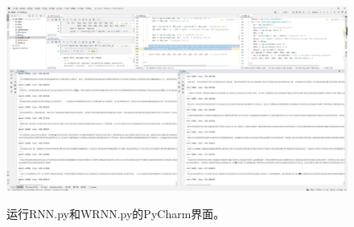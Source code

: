 \documentclass[letterpaper,12pt]{article}
\begin{document}
	\begin{figure}[htbp] 
		\centering 
		\includegraphics[width=\linewidth]{train}
		\captionsetup{font=scriptsize}
		\label{train}
		\captionsetup{font=scriptsize}
		\caption{
			\label{fig: train} %
			运行RNN.py和WRNN.py的PyCharm界面。
		}
	\end{figure}
	
	
	
	
\end{document}
